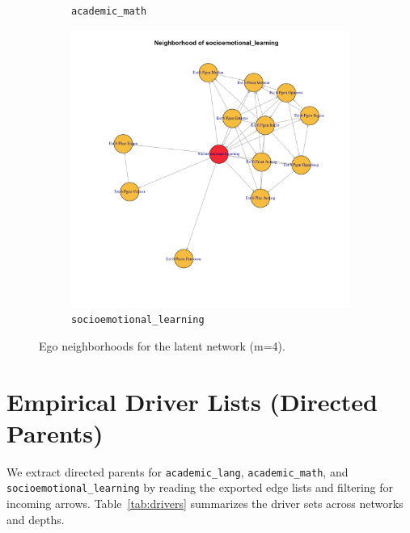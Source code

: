 \documentclass[11pt]{article}
\begin{document}
\begin{figure}[H]
\begin{subfigure}[b]{0.32\textwidth}
    \caption{\texttt{academic\_math}}
  \end{subfigure}
  \begin{subfigure}[b]{0.32\textwidth}
    \centering
    \includegraphics[width=\textwidth]{pc_estudiante_latent_socioemotional_learning_neighborhood_m4.png}
    \caption{\texttt{socioemotional\_learning}}
  \end{subfigure}
  \caption{Ego neighborhoods for the latent network (m=4).}
\end{figure}


\section{Empirical Driver Lists (Directed Parents)}
We extract directed parents for \texttt{academic\_lang}, \texttt{academic\_math}, and \texttt{socioemotional\_learning} by reading the exported edge lists and filtering for incoming arrows. Table~\ref{tab:drivers} summarizes the driver sets across networks and depths.
\end{document}
